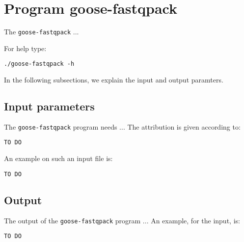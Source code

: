 \section{Program goose-fastqpack}
The \texttt{goose-fastqpack} ...

For help type:
\begin{lstlisting}
./goose-fastqpack -h
\end{lstlisting}
In the following subsections, we explain the input and output paramters.

\subsection*{Input parameters}

The \texttt{goose-fastqpack} program needs ...
The attribution is given according to:
\begin{lstlisting}
TO DO
\end{lstlisting}

An example on such an input file is:
\begin{lstlisting}
TO DO
\end{lstlisting}

\subsection*{Output}
The output of the \texttt{goose-fastqpack} program ...
An example, for the input, is:
\begin{lstlisting}
TO DO
\end{lstlisting}
